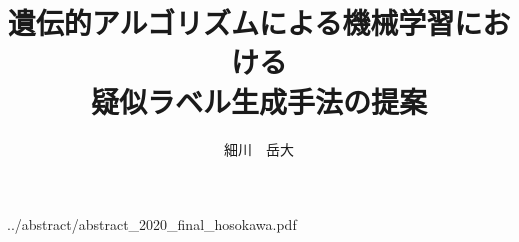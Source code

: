 \documentclass[12pt,dvipdfmx]{jarticle}
\title{遺伝的アルゴリズムによる機械学習における\\疑似ラベル生成手法の提案}
\author{細川　岳大}
\begin{document}
	\maketitle
	
	
	{../abstract/abstract_2020_final_hosokawa.pdf}
	\tableofcontents
	\newpage
	\listoffigures
	\newpage
	
	\listoftables
	\newpage
	
	
	
	\clearpage
	
	\clearpage
	
	
	\clearpage
	
	
	\clearpage
	
	
	\clearpage
	
	
	
	\clearpage
	\changeindent{0cm}
	
	
	
	
	
\end{document}
